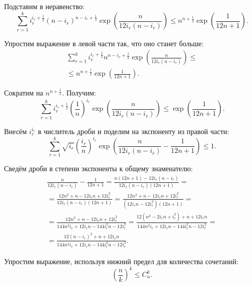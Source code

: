 Подставим в неравенство:
$$ \sum \limits_{r=1}^k i_r^{i_r + \frac{1}{2} } \left( n-i_r \right)^{n - i_r + \frac{1}{2} }
\exp \left( \frac{n}{12 i_r \left( n-i_r \right) } \right) \leq 
n^{n + \frac{1}{2} } \exp \left( \frac{1}{12 n+1} \right). $$

Упростим выражение в левой части так, что оно станет больше:
\begin{equation*}
\begin{split}
\sum \limits_{r=1}^k i_r^{i_r + \frac{1}{2} } n^{n - i_r + \frac{1}{2} }
\exp \left( \frac{n}{12 i_r \left( n-i_r \right) } \right) \leq \\
\leq n^{n + \frac{1}{2} } \exp \left( \frac{1}{12 n+1} \right).
\end{split}
\end{equation*}

Сократим на $ n^{n + \frac{1}{2} } $.
Получим:
$$ \sum \limits_{r=1}^k i_r^{i_r + \frac{1}{2} } \left( \frac{1}{n} \right)^{i_r}
\exp \left( \frac{n}{12 i_r \left( n-i_r \right) } \right) \leq
\exp \left( \frac{1}{12 n+1} \right). $$

Внесём $ i_r^{i_r} $ в числитель дроби и поделим на экспоненту из правой части:
$$ \sum \limits_{r=1}^k \sqrt{i_r} \left( \frac{i_r}{n} \right)^{i_r}
\exp \left( \frac{n}{12 i_r \left( n-i_r\right) } - \frac{1}{12 n + 1} \right) \leq 1. $$

Сведём дроби в степени экспоненты к общему знаменателю:
\begin{equation*}
\begin{split}
\frac{n}{12 i_r \left( n-i_r \right) } - \frac{1}{12 n + 1} =
\frac{n \left( 12 n + 1 \right) - 12 i_r \left( n-i_r \right) }{12 i_r \left( n-i_r \right) \left( 12 n + 1\right) } = \\
= \frac{12 n^2 + n - 12 i_r n + 12 i_r^2}{12 i_r \left( n-i_r \right) \left( 12 n + 1\right) } =
\frac{12 n^2 + n - 12 i_r n + 12 i_r^2}{ \left( 12 i_r n - 12 i_r^2 \right) \left( 12 n + 1 \right) } = \\
= \frac{12 n^2 + n - 12 i_r n + 12 i_r^2}{144 n^2 i_r + 12 i_r n - 144 i_r^2 n - 12 i_r^2} =
\frac{12 \left( n^2 -2 i_r n + i_r^2 \right) + n + 12 i_r n}{144 n^2 i_r + 12 i_r n - 144 i_r^2 n - 12 i_r^2} = \\
= \frac{12 \left( n-i_r\right)^2 + n + 12 i_r n }{144 n^2 i_r + 12 i_r n - 144 i_r^2 n - 12 i_r^2}.
\end{split}
\end{equation*}

Упростим выражение, используя нижний предел для количества сочетаний:
$$ \left( \frac{n}{k} \right)^k \leq C_n^k. $$

